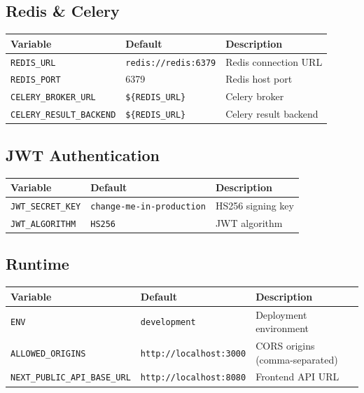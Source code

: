 \subsection{Redis \& Celery}

\begin{longtable}{@{}llp{5.5cm}@{}}
\toprule
\textbf{Variable} & \textbf{Default} & \textbf{Description} \\
\midrule
\endfirsthead
\bottomrule
\endfoot
\texttt{REDIS\_URL}              & \texttt{redis://redis:6379}  & Redis connection URL \\
\texttt{REDIS\_PORT}             & 6379                         & Redis host port \\
\texttt{CELERY\_BROKER\_URL}     & \texttt{\$\{REDIS\_URL\}}    & Celery broker \\
\texttt{CELERY\_RESULT\_BACKEND} & \texttt{\$\{REDIS\_URL\}}    & Celery result backend \\
\end{longtable}

\subsection{JWT Authentication}

\begin{longtable}{@{}llp{5.5cm}@{}}
\toprule
\textbf{Variable} & \textbf{Default} & \textbf{Description} \\
\midrule
\endfirsthead
\bottomrule
\endfoot
\texttt{JWT\_SECRET\_KEY} & \texttt{change-me-in-production} & HS256 signing key \\
\texttt{JWT\_ALGORITHM}   & \texttt{HS256}                   & JWT algorithm \\
\end{longtable}

\subsection{Runtime}

\begin{longtable}{@{}llp{5.5cm}@{}}
\toprule
\textbf{Variable} & \textbf{Default} & \textbf{Description} \\
\midrule
\endfirsthead
\bottomrule
\endfoot
\texttt{ENV}                       & \texttt{development}                & Deployment environment \\
\texttt{ALLOWED\_ORIGINS}          & \texttt{http://localhost:3000}      & CORS origins (comma-separated) \\
\texttt{NEXT\_PUBLIC\_API\_BASE\_URL} & \texttt{http://localhost:8080}   & Frontend API URL \\
\end{longtable}

